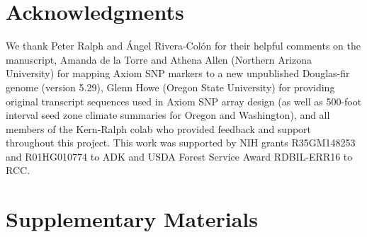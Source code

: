\documentclass[]{article}
\newcommand{\dfir}{Douglas-fir\xspace}
\newcommand{\beginsupplement}{%
    \setcounter{table}{0}
    \renewcommand{\thetable}{S\arabic{table}}%
    \setcounter{figure}{0}
    \renewcommand{\thefigure}{S\arabic{figure}}%
    \renewcommand{\theHtable}{supp.\arabic{table}}%
    \renewcommand{\theHfigure}{supp.\arabic{figure}}%
}
\begin{document}
\section{Acknowledgments}
We thank Peter Ralph and \'Angel Rivera-Col\'on for their helpful comments on the manuscript,
Amanda de la Torre and Athena Allen (Northern Arizona University) for mapping Axiom SNP markers 
to a new unpublished \dfir{} genome (version 5.29), Glenn Howe (Oregon State University) for providing 
original transcript sequences used in Axiom SNP array design (as well as 500-foot interval seed zone 
climate summaries for Oregon and Washington),
and all members of the Kern-Ralph colab who provided feedback and support throughout this project.
This work was supported by NIH grants R35GM148253 and R01HG010774 to ADK and 
USDA Forest Service Award RDBIL-ERR16 to RCC.


\printbibliography

\newpage
\beginsupplement
\section*{Supplementary Materials}
\end{document}
